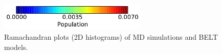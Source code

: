\documentclass[12pt]{article}
\begin{document}
\begin{figure}
\begin{center}
\includegraphics[width=7.05cm]{figures/ALA3_rama_colorbar.pdf}
\end{center}

\caption{
Ramachandran plots (2D histograms) of MD simulations and BELT models.  
}
\label{figure:test}


\end{figure}

\newpage


\begin{figure}

\end{figure}
\end{document}
